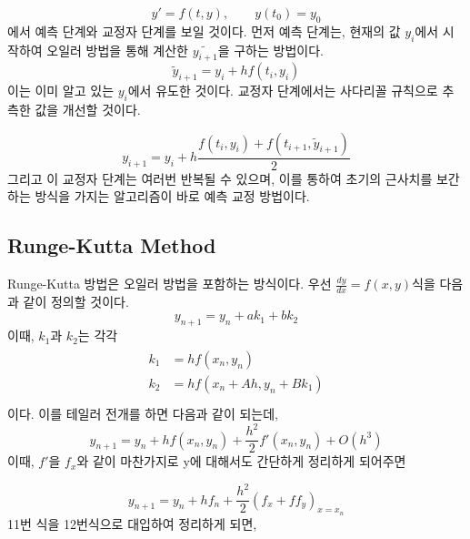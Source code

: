 \documentclass[11pt]{article}
\begin{document}
\begin{equation}
y' = f(t, y)
,\qquad
y(t_0) = y_0
\end{equation}
\noindent
에서 예측 단계와 교정자 단계를 보일 것이다. 먼저 예측 단계는, 현재의 값 $y_{i}$에서 시작하여 오일러 방법을 통해 계산한 $\tilde{y_{i+1}}$을 구하는 방법이다.
\begin{equation}
\tilde{y}_{i + 1} = y_i + h f(t_i, y_i)
\end{equation}
이는 이미 알고 있는 $y_{i}$에서 유도한 것이다. 교정자 단계에서는 사다리꼴 규칙으로 추측한 값을 개선할 것이다.

\begin{equation}
y_{i + 1} = y_i + h \frac{f(t_i, y_i) + f(t_{i + 1}, \tilde{y}_{i + 1})}{2}
\end{equation}
그리고 이 교정자 단계는 여러번 반복될 수 있으며, 이를 통하여 초기의 근사치를 보간하는 방식을 가지는 알고리즘이 바로 예측 교정 방법이다.













\subsection{Runge-Kutta Method} 
Runge-Kutta 방법은 오일러 방법을 포함하는 방식이다. 우선 $\frac{dy}{dx} = f(x, y)$식을 다음과 같이 정의할 것이다.
\begin{equation}
y_{n + 1} = y_n + a k_1 + b k_2
\end{equation}
이때, $k_1$과 $k_2$는 각각
\begin{equation}
\begin{split}
\begin{aligned}
k_1 &= h f(x_n, y_n) \\
k_2 &= h f(x_n + Ah, y_n + Bk_1) \\
\end{aligned}
\end{split}
\end{equation}
이다. 이를 테일러 전개를 하면 다음과 같이 되는데,
\begin{equation}
y_{n + 1} = y_n + h f(x_n, y_n) + \frac{h^2}{2} f'(x_n, y_n) + O(h^3)
\end{equation}
이때, $f'$을 $f_{x}$와 같이 마찬가지로 y에 대해서도 간단하게 정리하게 되어주면

\begin{equation}
y_{n + 1} = y_n + h f_n + \frac{h^2}{2} (f_x + f f_y)_{x = x_n}
\end{equation}
11번 식을 12번식으로 대입하여 정리하게 되면,
\end{document}

